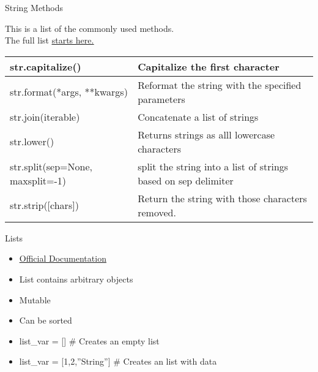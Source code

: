 % 
% 
% 
\begin{Slide}{String Methods}

  This is a list of the commonly used methods.\\
  The full list \underline{\href{https://docs.python.org/3/library/stdtypes.html\#str.capitalize}{starts here.}}

  \begin{table}[h]
    \begin{tabular}{|l|p{5cm}|} \hline
      str.capitalize()    & Capitalize the first character \\ \hline
      str.format(*args, **kwargs)    & Reformat the string with the specified parameters \\ \hline
      str.join(iterable)  & Concatenate a list of strings \\ \hline 
      str.lower()    & Returns strings as alll lowercase characters \\ \hline
      str.split(sep=None, maxsplit=-1)   & split the string into a list of strings based on sep delimiter  \\ \hline
      str.strip([chars])   & Return the string with those characters removed. \\ \hline
    \end{tabular}
  \end{table}

\end{Slide}


% 
% 
% 
\begin{Slide}{Lists}
  \begin{itemize}
  \item \underline{\href{https://docs.python.org/3/library/stdtypes.html\#lists}{Official Documentation}}
  \item List contains arbitrary objects
  \item Mutable 
  \item Can be sorted
  \item list\_var = []  \# Creates an empty list
  \item list\_var = [1,2,''String'']  \# Creates an list with data
  \end{itemize}
\end{Slide}

